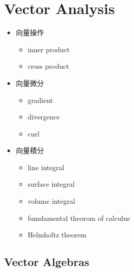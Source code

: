 \documentclass[letterpaper,10pt,english]{jupyterBook}
\begin{document}
\chapter{Vector Analysis}
\label{\detokenize{va/intro:vector-analysis}}\label{\detokenize{va/intro::doc}}\begin{itemize}
\item {} 
\sphinxAtStartPar
向量操作
\begin{itemize}
\item {} 
\sphinxAtStartPar
inner product

\item {} 
\sphinxAtStartPar
cross product

\end{itemize}

\item {} 
\sphinxAtStartPar
向量微分
\begin{itemize}
\item {} 
\sphinxAtStartPar
gradient

\item {} 
\sphinxAtStartPar
divergence

\item {} 
\sphinxAtStartPar
curl

\end{itemize}

\item {} 
\sphinxAtStartPar
向量積分
\begin{itemize}
\item {} 
\sphinxAtStartPar
line integral

\item {} 
\sphinxAtStartPar
surface integral

\item {} 
\sphinxAtStartPar
volume integral

\item {} 
\sphinxAtStartPar
fumdamental theorom of calculus

\item {} 
\sphinxAtStartPar
Helmholtz theorem

\end{itemize}

\end{itemize}


\section{Vector Algebras}
\label{\detokenize{va/vec_alge:vector-algebras}}\label{\detokenize{va/vec_alge::doc}}
\end{document}

